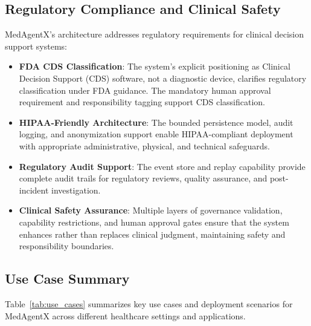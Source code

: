 \documentclass[journal]{IEEEtran}
\begin{document}
\subsection{Regulatory Compliance and Clinical Safety}

MedAgentX's architecture addresses regulatory requirements for clinical decision support systems:

\begin{itemize}
    \item \textbf{FDA CDS Classification}: The system's explicit positioning as Clinical Decision Support (CDS) software, not a diagnostic device, clarifies regulatory classification under FDA guidance. The mandatory human approval requirement and responsibility tagging support CDS classification.
    \item \textbf{HIPAA-Friendly Architecture}: The bounded persistence model, audit logging, and anonymization support enable HIPAA-compliant deployment with appropriate administrative, physical, and technical safeguards.
    \item \textbf{Regulatory Audit Support}: The event store and replay capability provide complete audit trails for regulatory reviews, quality assurance, and post-incident investigation.
    \item \textbf{Clinical Safety Assurance}: Multiple layers of governance validation, capability restrictions, and human approval gates ensure that the system enhances rather than replaces clinical judgment, maintaining safety and responsibility boundaries.
\end{itemize}

\subsection{Use Case Summary}

Table~\ref{tab:use_cases} summarizes key use cases and deployment scenarios for MedAgentX across different healthcare settings and applications.
\end{document}
